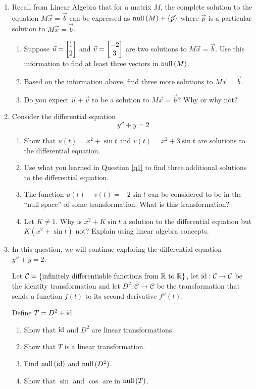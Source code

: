 \begin{enumerate}
	\item\label{q1}
	Recall from Linear Algebra that for a matrix $M$, the complete solution to the equation $M\vec x=\vec b$ can be expressed as
	$
		\mathrm{null}\,(M)+\{\vec p\}
	$
		where $\vec p$ is a particular solution to $M\vec x=\vec b$.
		
	\begin{enumerate}
		\item Suppose $\vec u=\begin{bmatrix}1\\2\end{bmatrix}$ and $\vec v=\begin{bmatrix}-2\\3\end{bmatrix}$ are two solutions to $M\vec x=\vec b$. Use this information
		to find at least three vectors in $\mathrm{null}\,(M)$.
		\item Based on the information above, find three more solutions to $M\vec x=\vec b$.
		\item Do you expect $\vec u+\vec v$ to be a solution to $M\vec x=\vec b$? Why or why not?
	\end{enumerate}

	\item Consider the differential equation
	\[
		y''+y=2
	\]
	\begin{enumerate}
		\item Show that $u(t)=x^2+\sin t$ and $v(t)=x^2+3\sin t$ are solutions to the differential equation.
		\item Use what you learned in Question \ref{q1} to find three additional solutions to the differential equation.
		\item The function $u(t)-v(t)=-2\sin t$ can be considered to be in the ``null space'' of some transformation. What is this transformation?
		\item Let $K\neq 1$. Why is $x^2+K\sin t$ a solution to the differential equation but $K(x^2+\sin t)$ not? Explain using linear algebra concepts.
	\end{enumerate}

	\item In this question, we will continue exploring the differential equation $y''+y=2$.
	
	Let $\mathcal C=\{\text{infinitely differentiable functions from $\mathbb{R}$ to $\mathbb{R}$}\}$, let $\operatorname{id}:\mathcal C\to\mathcal C$
	be the identity transformation and let $D^2:\mathcal C\to\mathcal C$ be the transformation that sends a function $f(t)$ to its second derivative $f''(t)$.

	Define $T=D^2+\operatorname{id}$.

	\begin{enumerate}
		\item Show that $\operatorname{id}$ and $D^2$ are linear transformations.
		\item Show that $T$ is a linear transformation.
		\item Find $\mathrm{null}\,(\operatorname{id})$ and $\mathrm{null}\,(D^2)$.
		\item Show that $\sin$ and $\cos$ are in $\mathrm{null}\,(T)$.
	\end{enumerate}



\end{enumerate}
